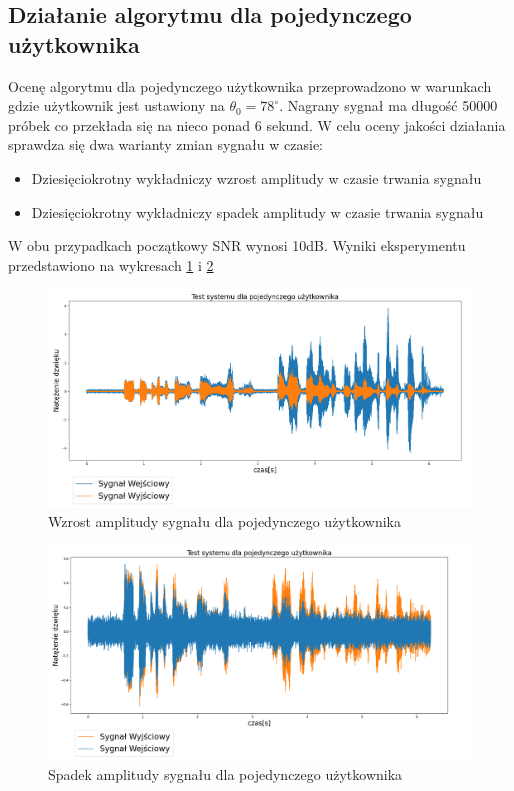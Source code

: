 \subsection{Działanie algorytmu dla pojedynczego użytkownika}

Ocenę algorytmu dla pojedynczego użytkownika przeprowadzono w warunkach gdzie użytkownik jest ustawiony na $\theta_{0}=78^{\circ}$. Nagrany sygnał ma długość 50000 próbek co przekłada się na nieco ponad 6 sekund.
\noindent W celu oceny jakości działania sprawdza się dwa warianty zmian sygnału w czasie:
\begin{itemize}
    \item Dziesięciokrotny wykładniczy wzrost amplitudy w czasie trwania sygnału
    \item Dziesięciokrotny wykładniczy spadek amplitudy w czasie trwania sygnału
\end{itemize}

\noindent W obu przypadkach początkowy SNR wynosi 10dB. Wyniki eksperymentu przedstawiono na wykresach \ref{fig:single_user_increasing} i \ref{fig:single_user_decreasing}

\begin{figure}[h]
    \centering
    \includegraphics[width=\textwidth]{Images/single_user_increasing.png}
    \caption{Wzrost amplitudy sygnału dla pojedynczego użytkownika}
    \label{fig:single_user_increasing}
\end{figure}

\begin{figure}
    \centering
    \includegraphics[width=\textwidth]{Images/single_user_decreasing.png}
    \caption{Spadek amplitudy sygnału dla pojedynczego użytkownika}
    \label{fig:single_user_decreasing}
\end{figure}

